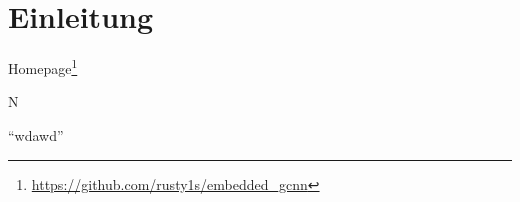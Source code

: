 \chapter{Einleitung}
\label{einleitung}

Homepage\footnote{\url{https://github.com/rusty1s/embedded\_gcnn}}

\gls{N}

\enquote{wdawd}



